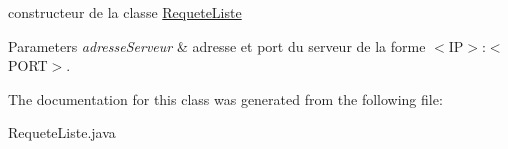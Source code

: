 constructeur de la classe \hyperlink{classrequete_1_1RequeteListe}{Requete\+Liste} 


\begin{DoxyParams}{Parameters}
{\em adresse\+Serveur} & adresse et port du serveur de la forme $<$\+I\+P$>$\+:$<$\+P\+O\+R\+T$>$. \\
\hline
\end{DoxyParams}


The documentation for this class was generated from the following file\+:\begin{DoxyCompactItemize}
\item 
Requete\+Liste.\+java\end{DoxyCompactItemize}
